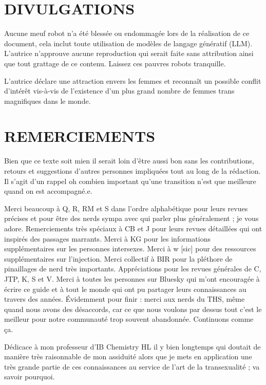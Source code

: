 \documentclass{article}
\begin{document}
 

\section*{DIVULGATIONS}

Aucune meuf robot n'a été blessée ou endommagée lors de la réalisation de ce document, cela inclut toute utilisation de modèles de langage génératif (LLM). L'autrice n'approuve aucune reproduction qui serait faite sans attribution ainsi que tout grattage de ce contenu. Laissez ces pauvres robots tranquille.

L'autrice déclare une attraction envers les femmes et reconnaît un possible conflit d'intérêt vis-à-vis de l'existence d'un plus grand nombre de femmes trans magnifiques dans le monde.

 

\section*{REMERCIEMENTS}

Bien que ce texte soit mien il serait loin d'être aussi bon sans les contributions, retours et suggestions d'autres personnes impliquées tout au long de la rédaction. Il s'agit d'un rappel oh combien important qu'une transition n'est que meilleure quand on est accompagné.e.

Merci beaucoup à Q, R, RM et S dans l'ordre alphabétique pour leurs revues précises et pour être des nerds sympa avec qui parler plus généralement ; je vous adore. Remerciements très spéciaux à CB et J pour leurs revues détaillées qui ont inspirés des passages marrants. Merci à KG pour les informations supplémentaires sur les personnes intersexes. Merci à w [sic] pour des ressources supplémentaires sur l'injection. Merci collectif à BIR pour la pléthore de pinaillages de nerd très importants. Appréciations pour les revues générales de C, JTP, K, S et V. Merci à toutes les personnes sur Bluesky qui m'ont encouragée à écrire ce guide et à tout le monde qui ont pu partager leurs connaissances au travers des années. Évidemment pour finir : merci aux nerds du THS, même quand nous avons des désaccords, car ce que nous voulons par dessus tout c'est le meilleur pour notre communauté trop souvent abandonnée. Continuons comme ça.

Dédicace à mon professeur d'IB Chemistry HL il y bien longtemps qui doutait de manière très raisonnable de mon assiduité alors que je mets en application une très grande partie de ces connaissances au service de l'art de la transexualité ; va savoir pourquoi.
\end{document}
